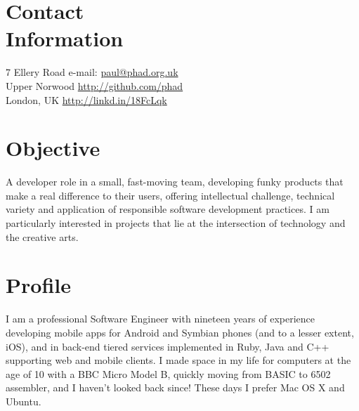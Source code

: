 \documentclass[margin = 0cm,line]{resume}
\begin{document}
\begin{resume}

    \section{\mysidestyle Contact\\Information}

    7 Ellery Road                          \hfill e-mail: \url{paul@phad.org.uk}            \vspace{0mm}\\\vspace{0mm}%
    Upper Norwood                          \hfill \url{http://github.com/phad}              \vspace{0mm}\\\vspace{0mm}%
    London, UK                             \hfill \url{http://linkd.in/18FcLqk}          \vspace{0mm}\\\vspace{-4.5mm}%

    \section{\mysidestyle Objective}

    A developer role in a small, fast-moving team, developing funky products that make a real difference to their
    users, offering intellectual challenge, technical variety and application of responsible software development
    practices.  I am particularly interested in projects that lie at the intersection of technology and the creative
    arts.


    \section{\mysidestyle Profile}

    I am a professional Software Engineer with nineteen years of experience developing mobile apps for Android and
    Symbian phones (and to a lesser extent, iOS), and in back-end tiered services implemented in Ruby, Java and C++
    supporting web and mobile clients.  I made space in my life for computers at the age of 10 with a BBC Micro Model
    B, quickly moving from BASIC to 6502 assembler, and I haven't looked back since!  These days I prefer Mac OS X and
    Ubuntu.


\end{resume}
\end{document}
